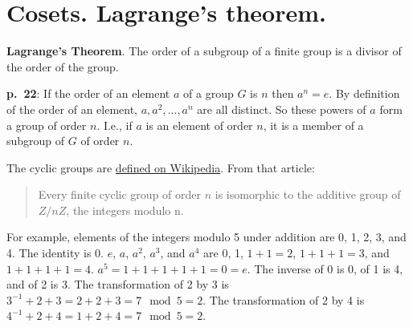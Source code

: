 \section{Cosets. Lagrange's theorem.}

{\bf Lagrange's Theorem}. The order of a subgroup of a finite group is
a divisor of the order of the group.

{\bf p.\ 22}: If the order of an element $a$ of a group $G$ is $n$
then $a^n = e$. By definition of the order of an element,
$a,a^2,...,a^n$ are all distinct. So these powers of $a$ form a group
of order $n$. I.e., if $a$ is an element of order $n$, it is a member
of a subgroup of $G$ of order $n$.

The cyclic groups are
\href{https://en.wikipedia.org/wiki/Cyclic_group}{defined on
  Wikipedia}. From that article:

\begin{quote}
Every finite cyclic group of order $n$ is isomorphic to the additive
group of $Z/nZ$, the integers modulo n.
\end{quote}

For example, elements of the integers modulo 5 under addition are 0,
1, 2, 3, and 4. The identity is 0. $e$, $a$, $a^2$, $a^3$, and $a^4$
are 0, 1, $1+1 = 2$, $1+1+1 = 3$, and $1+1+1+1 = 4$. $a^5 = 1 + 1 + 1+
1 + 1 = 0 = e$. The inverse of 0 is 0, of 1 is 4, and of 2 is 3. The
transformation of 2 by 3 is $3^{-1} + 2 + 3 = 2 + 2 + 3 = 7\mod 5 =
2$. The transformation of 2 by 4 is $4^{-1} + 2 + 4 = 1 + 2 + 4 =
7\mod 5 = 2$.



